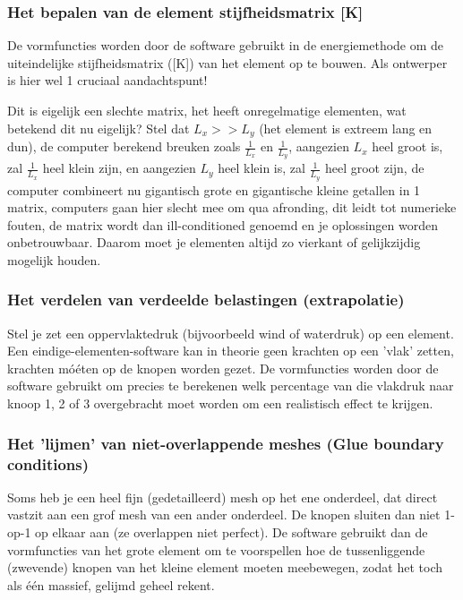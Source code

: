 \documentclass[a4paper,11pt,twoside]{report}
\begin{document}
\subsubsection{Het bepalen van de element stijfheidsmatrix [K]}
De vormfuncties worden door de software gebruikt in de energiemethode om de uiteindelijke
stijfheidsmatrix ([K]) van het element op te bouwen. Als ontwerper is hier wel 1 cruciaal
aandachtspunt!

\begin{conceptbox}
    Dit is eigelijk een slechte matrix, het heeft onregelmatige elementen, wat betekend dit nu
    eigelijk? Stel dat $L_x >> L_y$ (het element is extreem lang en dun), de computer berekend
    breuken zoals $\frac{1}{L_x}$ en $\frac{1}{L_y}$, aangezien $L_x$ heel groot is, zal
    $\frac{1}{L_x}$ heel klein zijn, en aangezien $L_y$ heel klein is, zal $\frac{1}{L_y}$ heel
    groot zijn, de computer combineert nu gigantisch grote en gigantische kleine getallen in 1
    matrix, computers gaan hier slecht mee om qua afronding, dit leidt tot numerieke fouten, de
    matrix wordt dan ill-conditioned genoemd en je oplossingen worden onbetrouwbaar. Daarom moet je
    elementen altijd zo vierkant of gelijkzijdig mogelijk houden.
\end{conceptbox}

\subsubsection{Het verdelen van verdeelde belastingen (extrapolatie)}
Stel je zet een oppervlaktedruk (bijvoorbeeld wind of waterdruk) op een element. Een
eindige-elementen-software kan in theorie geen krachten op een 'vlak' zetten, krachten móéten op de
knopen worden gezet. De vormfuncties worden door de software gebruikt om precies te berekenen welk
percentage van die vlakdruk naar knoop 1, 2 of 3 overgebracht moet worden om een realistisch effect
te krijgen.
\subsubsection{Het 'lijmen' van niet-overlappende meshes (Glue boundary conditions)}
Soms heb je een heel fijn (gedetailleerd) mesh op het ene onderdeel, dat direct vastzit aan een grof
mesh van een ander onderdeel. De knopen sluiten dan niet 1-op-1 op elkaar aan (ze overlappen niet
perfect). De software gebruikt dan de vormfuncties van het grote element om te voorspellen hoe de
tussenliggende (zwevende) knopen van het kleine element moeten meebewegen, zodat het toch als één
massief, gelijmd geheel rekent.
\end{document}
